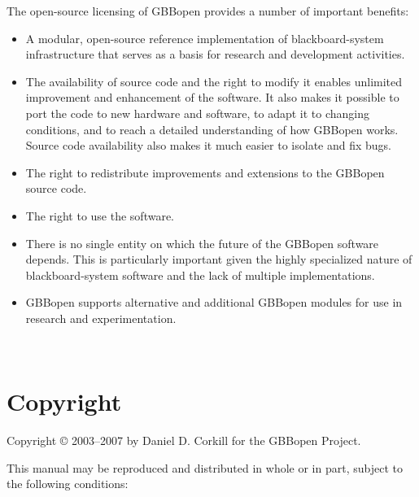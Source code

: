 \documentclass[10pt,twoside,english,pdftex]{article}
\begin{document}
{The open-source licensing of GBBopen provides a number of important benefits:
\begin{itemize}
\item A modular, open-source reference implementation of
  blackboard-system infrastructure that serves as a basis for research
  and development activities.
\item The availability of source code and the right to modify it
  enables unlimited improvement and enhancement of the software. It
  also makes it possible to port the code to new hardware and
  software, to adapt it to changing conditions, and to reach a
  detailed understanding of how GBBopen works. Source code
  availability also makes it much easier to isolate and fix bugs.
\item The right to redistribute improvements and extensions to the
  GBBopen source code.
\item The right to use the software.
\item There is no single entity on which the future of the GBBopen
  software depends. This is particularly important given the highly
  specialized nature of blackboard-system software and the lack of
  multiple implementations.
\item GBBopen supports alternative and additional GBBopen modules for
  use in research and experimentation.
\end{itemize}
}%


\T\begin{ifhtml} 
  \intro
  \setcounter{htmlautomenu}{0}
\T\end{ifhtml}

\T\thispagestyle{empty}


\T\newpage
\T~
\T\vfill
\W{}
\W\section*{Copyright}

Copyright \copyright{} 2003--2007 by Daniel D. Corkill for the
GBBopen Project.

This manual may be reproduced and distributed in whole or in
part, subject to the following conditions: 
\end{document}
